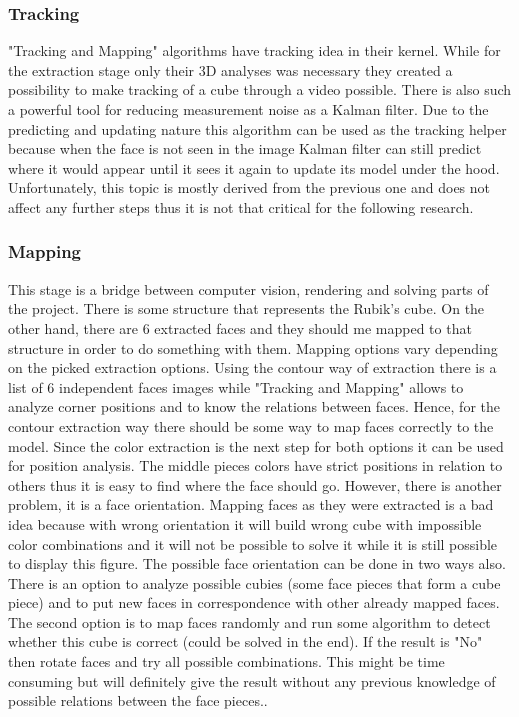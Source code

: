 \documentclass[../../main.tex]{subfiles}
\begin{document}
\subsubsection*{Tracking}

"Tracking and Mapping" algorithms have tracking idea in their kernel. While for the extraction stage only their 3D analyses was necessary they created a possibility to make tracking of a cube through a video possible. There is also such a powerful tool for reducing measurement noise as a Kalman filter. Due to the predicting and updating nature this algorithm can be used as the tracking helper because when the face is not seen in the image Kalman filter can still predict where it would appear until it sees it again to update its model under the hood. Unfortunately, this topic is mostly derived from the previous one and does not affect any further steps thus it is not that critical for the following research.

\subsubsection*{Mapping}

This stage is a bridge between computer vision, rendering and solving parts of the project. There is some structure that represents the Rubik's cube. On the other hand, there are 6 extracted faces and they should me mapped to that structure in order to do something with them. Mapping options vary depending on the picked extraction options. Using the contour way of extraction there is a list of 6 independent faces images while "Tracking and Mapping" allows to analyze corner positions and to know the relations between faces. Hence, for the contour extraction way there should be some way to map faces correctly to the model. Since the color extraction is the next step for both options it can be used for position analysis. The middle pieces colors have strict positions in relation to others thus it is easy to find where the face should go. However, there is another problem, it is a face orientation. Mapping faces as they were extracted is a bad idea because with wrong orientation it will build wrong cube with impossible color combinations and it will not be possible to solve it while it is still possible to display this figure. The possible face orientation can be done in two ways also. There is an option to analyze possible cubies (some face pieces that form a cube piece) and to put new faces in correspondence with other already mapped faces. The second option is to map faces randomly and run some algorithm to detect whether this cube is correct (could be solved in the end). If the result is "No" then rotate faces and try all possible combinations. This might be time consuming but will definitely give the result without any previous knowledge of possible relations between the face pieces..
\end{document}
